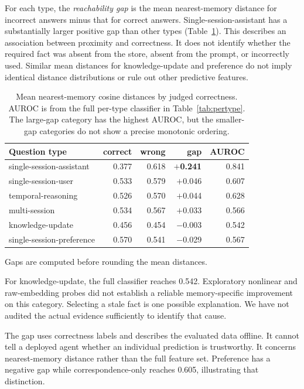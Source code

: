 \documentclass{article}
\begin{document}
For each type, the \emph{reachability gap} is the mean nearest-memory distance
for incorrect answers minus that for correct answers.
Single-session-assistant has a substantially larger positive gap than other
types (Table~\ref{tab:gap}).
This describes an association between proximity and correctness.
It does not identify whether the required fact was absent from the store,
absent from the prompt, or incorrectly used.
Similar mean distances for knowledge-update and preference do not imply
identical distance distributions or rule out other predictive features.

\begin{table}[h]
  \centering\small
  \caption{Mean nearest-memory cosine distances by judged correctness.
  AUROC is from the full per-type classifier in Table~\ref{tab:pertype}.
  The large-gap category has the highest AUROC, but the smaller-gap categories
  do not show a precise monotonic ordering.}
  \label{tab:gap}
  \begin{tabular}{lrrrr}
    \toprule
    Question type & correct & wrong & \textbf{gap} & AUROC \\
    \midrule
    single-session-assistant  & 0.377 & 0.618 & \textbf{$+$0.241} & 0.841 \\
    single-session-user       & 0.533 & 0.579 & $+$0.046 & 0.607 \\
    temporal-reasoning        & 0.526 & 0.570 & $+$0.044 & 0.628 \\
    multi-session             & 0.534 & 0.567 & $+$0.033 & 0.566 \\
    knowledge-update          & 0.456 & 0.454 & $-$0.003 & 0.542 \\
    single-session-preference & 0.570 & 0.541 & $-$0.029 & 0.567 \\
    \bottomrule
  \end{tabular}
\end{table}

Gaps are computed before rounding the mean distances.

For knowledge-update, the full classifier reaches 0.542.
Exploratory nonlinear and raw-embedding probes did not establish a reliable
memory-specific improvement on this category.
Selecting a stale fact is one possible explanation. We have not audited
the actual evidence sufficiently to identify that cause.

The gap uses correctness labels and describes the evaluated data offline.
It cannot tell a deployed agent whether an individual prediction is trustworthy.
It concerns nearest-memory distance rather than the full feature set.
Preference has a negative gap while correspondence-only reaches 0.605,
illustrating that distinction.
\end{document}
